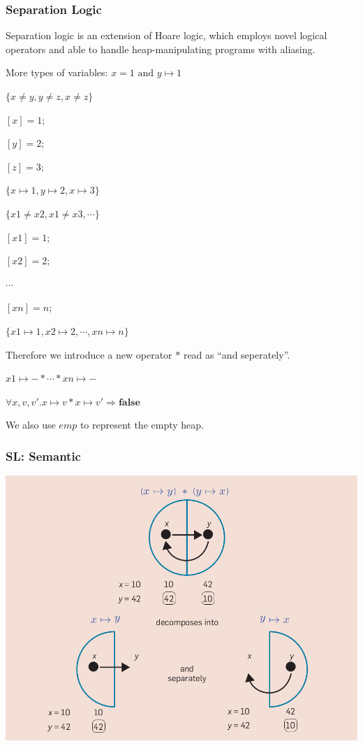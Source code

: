 \documentclass[11pt]{beamer}
\begin{document}
\begin{frame}\frametitle{Separation Logic}
Separation logic is an extension of Hoare logic, which employs novel logical operators and able to handle heap-manipulating programs with aliasing.

More types of variables: $x = 1 \text{ and } y\mapsto 1$
\begin{multicols}{2}
\begin{example}
$\{x\ne y, y \ne z, x\ne z\}$

$[x] = 1;$

$[y] = 2;$

$[z] = 3;$


$\{x\mapsto 1, y\mapsto 2 , x\mapsto 3\}$



\end{example}

\begin{example}
$\{x1\ne x2, x1 \ne x3, \cdots\}$

$[x1] = 1;$

$[x2] = 2;$

$\cdots$

$[xn] = n;$


$\{x1\mapsto 1, x2\mapsto 2 , \cdots , xn\mapsto n\}$



\end{example}

\end{multicols}
Therefore we introduce a new operator $\ast$ read as ``and seperately''.

$x1 \mapsto - \ast \cdots \ast xn \mapsto -$


$\forall x, v, v'. x\mapsto v \ast x\mapsto v' \Rightarrow \textbf{false}$

We also use $emp$ to represent the empty heap.
\end{frame}

\begin{frame}\frametitle{SL: Semantic}
\begin{center}
\includegraphics[scale=0.28]{picSema.png}
\end{center}
\end{frame}
\end{document}
